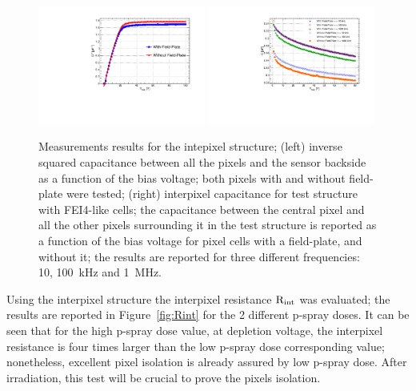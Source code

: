 \begin{figure}[tbp]
\begin{center}
\includegraphics[width=0.49\textwidth]{edgelessC-2V.pdf}
\includegraphics[width=0.49\textwidth]{edgelessInterpixelCV.pdf}
\caption{\label{fig:cv-testpixels}Measurements results for the intepixel structure; (left) inverse squared capacitance between all the  pixels and the sensor backside as a function of
the bias voltage; both pixels with  and without field-plate were tested; (right)
 interpixel capacitance for test structure with FEI4-like cells; the capacitance between the central pixel and
all the other pixels surrounding it in the test structure  is reported as a function of
the bias voltage for pixel cells with a field-plate, and
without it; the results are reported for three different frequencies: 10, 100~kHz and 1~MHz.}
\end{center}
\end{figure}

Using the interpixel structure  the interpixel resistance $\rm{R_{int}}$ was evaluated; the results are reported in Figure~\ref{fig:Rint} for the 2 different
p-spray doses. It can be seen that for the high p-spray dose value, at depletion voltage, the interpixel resistance is four times larger than  the low
p-spray dose corresponding value; nonetheless, excellent pixel isolation is already assured by low p-spray dose.
After irradiation, this test will be  crucial  to prove the pixels isolation.


